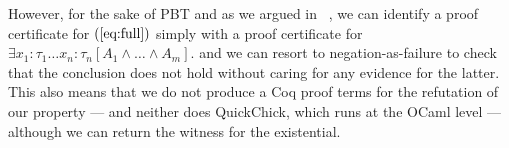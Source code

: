 %
However, for the sake of PBT and as we argued in~\cite{blanco19ppdp}  , we can identify a proof certificate for
$(\ref{eq:full})$ simply with a proof certificate for
$
 \exists x_1 \colon \tau_1\dots x_n \colon \tau_n [A_1\land\dots\land A_m].
$
and we can resort to negation-as-failure to check that the conclusion does not hold without caring for any evidence for the latter. This also means that we do not produce a Coq proof terms for the refutation of our property --- and neither does \textsf{QuickChick}, which runs at the OCaml level --- although we can return the witness for the existential.
%



